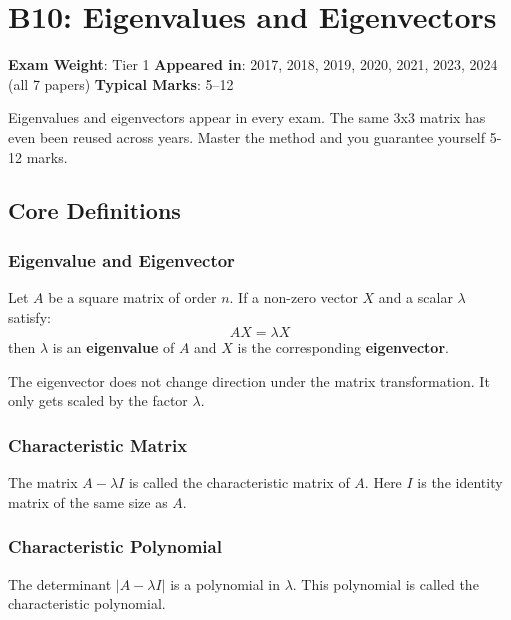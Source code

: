 \documentclass[
]{article}
\renewenvironment{quote}
  {\begin{tcolorbox}[
     colback=calloutbg,
     colframe=calloutframe,
     colupper=callouttext,
     arc=3pt,
     boxrule=0.5pt,
     leftrule=0.5pt,
     borderline west={3pt}{0pt}{calloutaccent},
     left=8pt,
     right=8pt,
     top=6pt,
     bottom=6pt
   ]}
  {\end{tcolorbox}}
\begin{document}
\section{B10: Eigenvalues and
Eigenvectors}\label{b10-eigenvalues-and-eigenvectors}

\begin{quote}
\textbf{Exam Weight}: Tier 1 \textbar{} \textbf{Appeared in}: 2017,
2018, 2019, 2020, 2021, 2023, 2024 (all 7 papers) \textbar{}
\textbf{Typical Marks}: 5--12
\end{quote}

Eigenvalues and eigenvectors appear in every exam. The same 3x3 matrix
has even been reused across years. Master the method and you guarantee
yourself 5-12 marks.

\subsection{Core Definitions}\label{core-definitions}

\subsubsection{Eigenvalue and
Eigenvector}\label{eigenvalue-and-eigenvector}

Let \(A\) be a square matrix of order \(n\). If a non-zero vector \(X\)
and a scalar \(\lambda\) satisfy:
\[
AX = \lambda X
\]
then \(\lambda\) is an \textbf{eigenvalue} of \(A\) and \(X\) is the
corresponding \textbf{eigenvector}.

The eigenvector does not change direction under the matrix
transformation. It only gets scaled by the factor \(\lambda\).

\subsubsection{Characteristic Matrix}\label{characteristic-matrix}

The matrix \(A - \lambda I\) is called the characteristic matrix of
\(A\). Here \(I\) is the identity matrix of the same size as \(A\).

\subsubsection{Characteristic
Polynomial}\label{characteristic-polynomial}

The determinant \(\lvert A - \lambda I \rvert\) is a polynomial in
\(\lambda\). This polynomial is called the characteristic polynomial.
\end{document}
